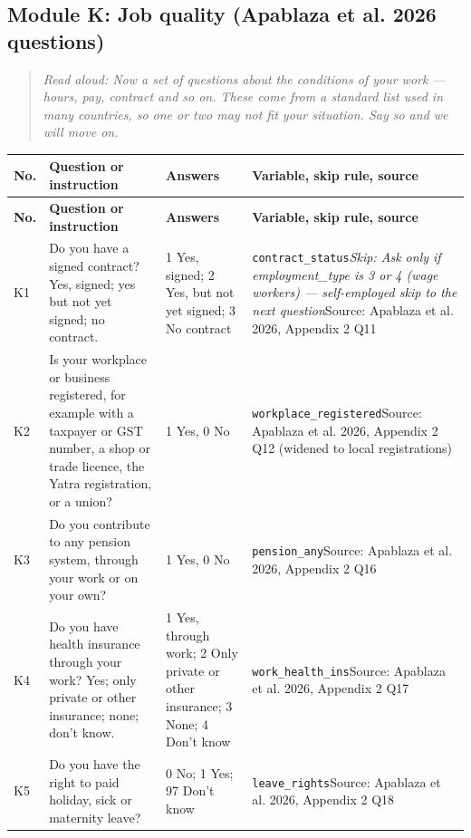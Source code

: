 \documentclass[10pt]{article}
\begin{document}
\subsection*{Module K: Job quality (Apablaza et al. 2026 questions)}
\begin{quote}\small\textit{Read aloud: Now a set of questions about the conditions of your work — hours, pay, contract and so on. These come from a standard list used in many countries, so one or two may not fit your situation. Say so and we will move on.}\end{quote}
{\scriptsize
\begin{longtable}{p{0.8cm}p{6.4cm}p{3.6cm}p{5.8cm}}
\toprule
\textbf{No.} & \textbf{Question or instruction} & \textbf{Answers} & \textbf{Variable, skip rule, source} \\
\midrule
\endfirsthead
\toprule
\textbf{No.} & \textbf{Question or instruction} & \textbf{Answers} & \textbf{Variable, skip rule, source} \\
\midrule
\endhead
K1 & Do you have a signed contract? Yes, signed; yes but not yet signed; no contract. & 1 Yes, signed; 2 Yes, but not yet signed; 3 No contract & \texttt{contract\_status}\newline \textit{Skip: Ask only if employment\_type is 3 or 4 (wage workers) — self-employed skip to the next question}\newline Source: Apablaza et al. 2026, Appendix 2 Q11 \\
K2 & Is your workplace or business registered, for example with a taxpayer or GST number, a shop or trade licence, the Yatra registration, or a union? & 1 Yes, 0 No & \texttt{workplace\_registered}\newline Source: Apablaza et al. 2026, Appendix 2 Q12 (widened to local registrations) \\
K3 & Do you contribute to any pension system, through your work or on your own? & 1 Yes, 0 No & \texttt{pension\_any}\newline Source: Apablaza et al. 2026, Appendix 2 Q16 \\
K4 & Do you have health insurance through your work? Yes; only private or other insurance; none; don't know. & 1 Yes, through work; 2 Only private or other insurance; 3 None; 4 Don't know & \texttt{work\_health\_ins}\newline Source: Apablaza et al. 2026, Appendix 2 Q17 \\
K5 & Do you have the right to paid holiday, sick or maternity leave? & 0 No; 1 Yes; 97 Don't know & \texttt{leave\_rights}\newline Source: Apablaza et al. 2026, Appendix 2 Q18 \\

\end{longtable}}
\end{document}
